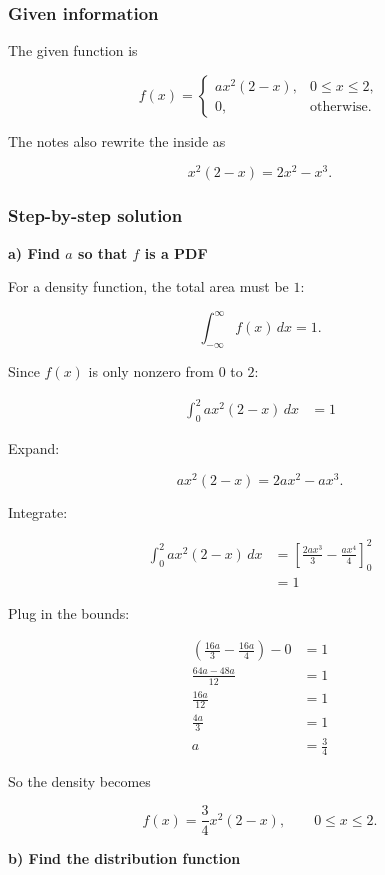\documentclass[10pt]{article}
\begin{document}
\subsubsection*{Given information}
The given function is

\[
f(x)=
\begin{cases}
ax^2(2-x),
& 0\leq x\leq 2,\\
0,
& \text{otherwise.}
\end{cases}
\]

The notes also rewrite the inside as

\[
x^2(2-x)=2x^2-x^3.
\]

\subsubsection*{Step-by-step solution}

\RepeatedQuestion{\uppgiftTwoQuestion}
\textbf{a) Find $a$ so that $f$ is a PDF}

For a density function, the total area must be $1$:

\[
\int_{-\infty}^{\infty} f(x)\,dx=1.
\]

Since $f(x)$ is only nonzero from $0$ to $2$:

\begin{align*}
\int_0^2 ax^2(2-x)\,dx
&=1
\end{align*}

Expand:

\[
ax^2(2-x)=2ax^2-ax^3.
\]

Integrate:

\begin{align*}
\int_0^2 ax^2(2-x)\,dx
&=
\left[
\frac{2ax^3}{3}
-\frac{ax^4}{4}
\right]_0^2 \\[2mm]
&=1
\end{align*}

Plug in the bounds:

\begin{align*}
\left(
\frac{16a}{3}
-\frac{16a}{4}
\right)-0
&=1 \\[2mm]
\frac{64a-48a}{12}
&=1 \\[2mm]
\frac{16a}{12}
&=1 \\[2mm]
\frac{4a}{3}
&=1 \\[2mm]
a
&=\frac{3}{4}
\end{align*}

So the density becomes

\[
f(x)=\frac{3}{4}x^2(2-x),
\qquad 0\leq x\leq 2.
\]

\RepeatedQuestion{\uppgiftTwoQuestion}
\textbf{b) Find the distribution function}
\end{document}
